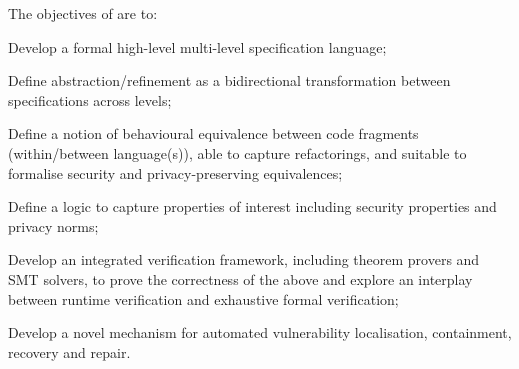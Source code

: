 \addtocounter{wpno}{1}
\begin{Workpackage}{\thewpno}
\WPTitle{\wpname{\thewpno}}


\begin{WPObjectives}
The objectives of \theWP{} are to:
\begin{compactitem}
\item Develop a formal high-level multi-level specification language; %
\item Define abstraction/refinement as a bidirectional transformation between specifications across levels;
\item Define a notion of behavioural equivalence between code fragments (within/between language(s)), able to capture refactorings, and suitable to formalise security and privacy-preserving equivalences;
\item Define a logic to capture properties of interest  %
including security properties and privacy norms;
\item Develop an integrated verification framework, including theorem provers and SMT solvers, to prove the correctness of the above and 
 explore an interplay between runtime verification and exhaustive formal verification;
\item Develop a novel mechanism for automated vulnerability localisation, containment, recovery and repair.

\end{compactitem}

\end{WPObjectives}


\end{Workpackage}

